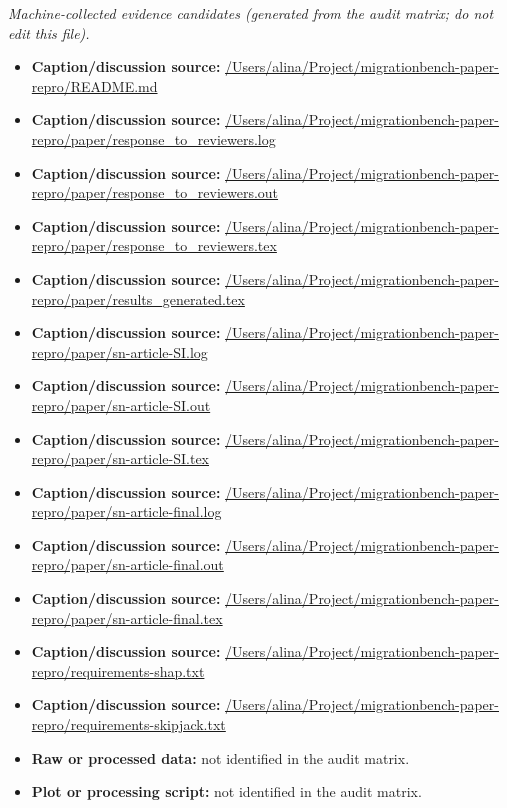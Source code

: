 \emph{Machine-collected evidence candidates (generated from the audit matrix; do not edit this file).}
\begin{itemize}[leftmargin=1.4em,noitemsep]
\item \textbf{Caption/discussion source:} \url{/Users/alina/Project/migrationbench-paper-repro/README.md}
\item \textbf{Caption/discussion source:} \url{/Users/alina/Project/migrationbench-paper-repro/paper/response_to_reviewers.log}
\item \textbf{Caption/discussion source:} \url{/Users/alina/Project/migrationbench-paper-repro/paper/response_to_reviewers.out}
\item \textbf{Caption/discussion source:} \url{/Users/alina/Project/migrationbench-paper-repro/paper/response_to_reviewers.tex}
\item \textbf{Caption/discussion source:} \url{/Users/alina/Project/migrationbench-paper-repro/paper/results_generated.tex}
\item \textbf{Caption/discussion source:} \url{/Users/alina/Project/migrationbench-paper-repro/paper/sn-article-SI.log}
\item \textbf{Caption/discussion source:} \url{/Users/alina/Project/migrationbench-paper-repro/paper/sn-article-SI.out}
\item \textbf{Caption/discussion source:} \url{/Users/alina/Project/migrationbench-paper-repro/paper/sn-article-SI.tex}
\item \textbf{Caption/discussion source:} \url{/Users/alina/Project/migrationbench-paper-repro/paper/sn-article-final.log}
\item \textbf{Caption/discussion source:} \url{/Users/alina/Project/migrationbench-paper-repro/paper/sn-article-final.out}
\item \textbf{Caption/discussion source:} \url{/Users/alina/Project/migrationbench-paper-repro/paper/sn-article-final.tex}
\item \textbf{Caption/discussion source:} \url{/Users/alina/Project/migrationbench-paper-repro/requirements-shap.txt}
\item \textbf{Caption/discussion source:} \url{/Users/alina/Project/migrationbench-paper-repro/requirements-skipjack.txt}
\item \textbf{Raw or processed data:} not identified in the audit matrix.
\item \textbf{Plot or processing script:} not identified in the audit matrix.
\end{itemize}

